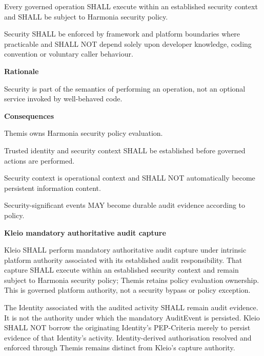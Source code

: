 Every governed operation SHALL execute within an established security
context and SHALL be subject to Harmonia security policy.



Security SHALL be enforced by framework and platform boundaries where
practicable and SHALL NOT depend solely upon developer knowledge, coding
convention or voluntary caller behaviour.



\par\medskip\textbf{Rationale}\par


Security is part of the semantics of performing an operation, not an
optional service invoked by well-behaved code.



\par\medskip\textbf{Consequences}\par


Themis owns Harmonia security policy evaluation.



Trusted identity and security context SHALL be established before
governed actions are performed.



Security context is operational context and SHALL NOT automatically
become persistent information content.



Security-significant events MAY become durable audit evidence according
to policy.







\par\medskip\textbf{Kleio mandatory authoritative audit capture}\par


Kleio SHALL perform mandatory authoritative audit capture under intrinsic
platform authority associated with its established audit responsibility.
That capture SHALL execute within an established security context and remain
subject to Harmonia security policy; Themis retains policy evaluation ownership.
This is governed platform authority, not a security bypass or policy exception.



The Identity associated with the audited activity SHALL remain audit evidence.
It is not the authority under which the mandatory AuditEvent is persisted.
Kleio SHALL NOT borrow the originating Identity's PEP-Criteria merely to persist
evidence of that Identity's activity. Identity-derived authorisation resolved
and enforced through Themis remains distinct from Kleio's capture authority.



